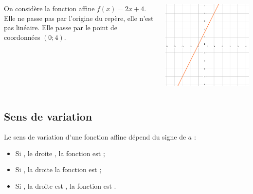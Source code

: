 \documentclass[xcolor={dvipsnames}]{beamer}
\begin{document}
\begin{frame}
\begin{myex}
		\begin{columns}[c]
			\begin{column}{6cm}
				On considère la fonction affine $f(x)=2x+4$. Elle ne passe pas par l'origine du repère, elle n'est pas linéaire. Elle passe par le point de coordonnées $(0;4)$.
			\end{column}
			
			\begin{column}{6cm}
				\includegraphics[scale=0.5]{ex1}
			\end{column}			
			
		\end{columns}
	\end{myex}
\end{frame}

\subsection{Sens de variation}

\begin{frame}

\begin{myprop}
	Le sens de variation d'une fonction affine dépend du signe de $a$ :
	\begin{itemize}
		\item Si , le droite , la fonction est ;
		\item Si , la droite  la fonction est ;
		\item Si , la droite est , la fonction est .
	\end{itemize}
\end{myprop}

\end{frame}
\end{document}
